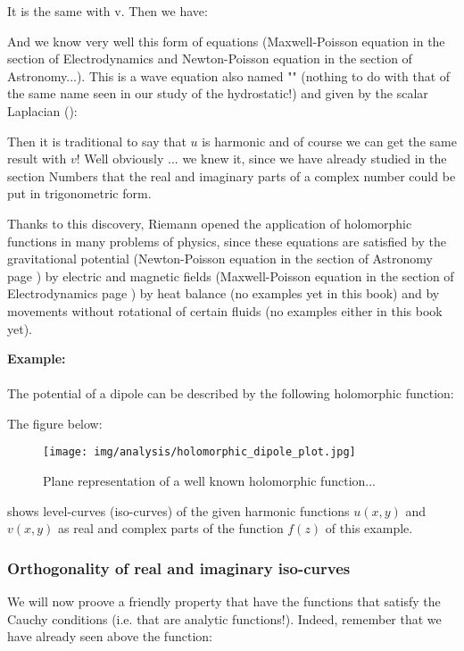 	It is the same with v. Then we have:
	
	And we know very well this form of equations (Maxwell-Poisson equation in the section of Electrodynamics and Newton-Poisson equation in the section of Astronomy...). This is a wave equation also named "" (nothing to do with that of the same name seen in our study of the hydrostatic!) and given by the scalar Laplacian ():
	
	Then it is traditional to say that $u$ is harmonic and of course we can get the same result with $v$! Well obviously ... we knew it, since we have already studied in the section Numbers that the real and imaginary parts of a complex number could be put in trigonometric form.

	Thanks to this discovery, Riemann opened the application of holomorphic functions in many problems of physics, since these equations are satisfied by the gravitational potential (Newton-Poisson equation in the section of Astronomy page \pageref{newton-poisson equation}) by electric and magnetic fields (Maxwell-Poisson equation in the section of Electrodynamics page \pageref{maxwell-poisson equation}) by heat balance (no examples yet in this book) and by movements without rotational of certain fluids (no examples either in this book yet).

	
	\begin{tcolorbox}[colframe=black,colback=white,sharp corners]
	\textbf{{\Large {}}Example:}\\\\
	The potential of a dipole can be described by the following holomorphic function:
	
	The figure below:
	\begin{figure}[H]
		\centering
		\texttt{[image: img/analysis/holomorphic\_dipole\_plot.jpg]}
		\caption{Plane representation of a well known holomorphic function...}
	\end{figure}
	shows level-curves (iso-curves) of the given harmonic functions $u (x, y)$ and $v (x, y)$ as real and complex parts of the function $f (z)$ of this example.
	\end{tcolorbox}
	
	
	\pagebreak
	\subsubsection{Orthogonality of real and imaginary iso-curves}
	We will now proove a friendly property that have the functions that satisfy the Cauchy conditions (i.e. that are analytic functions!). Indeed, remember that we have already seen above the function:
	
